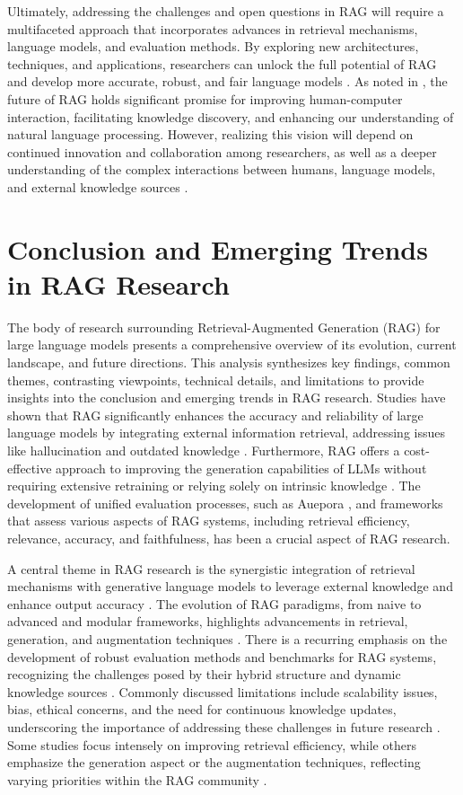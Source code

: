 \documentclass[conference]{IEEEtran}
\begin{document}
Ultimately, addressing the challenges and open questions in RAG will require a multifaceted approach that incorporates advances in retrieval mechanisms, language models, and evaluation methods. By exploring new architectures, techniques, and applications, researchers can unlock the full potential of RAG and develop more accurate, robust, and fair language models \cite{b13}. As noted in \cite{b14}, the future of RAG holds significant promise for improving human-computer interaction, facilitating knowledge discovery, and enhancing our understanding of natural language processing. However, realizing this vision will depend on continued innovation and collaboration among researchers, as well as a deeper understanding of the complex interactions between humans, language models, and external knowledge sources \cite{b15}.

\section{Conclusion and Emerging Trends in RAG Research}
The body of research surrounding Retrieval-Augmented Generation (RAG) for large language models presents a comprehensive overview of its evolution, current landscape, and future directions. This analysis synthesizes key findings, common themes, contrasting viewpoints, technical details, and limitations to provide insights into the conclusion and emerging trends in RAG research. Studies have shown that RAG significantly enhances the accuracy and reliability of large language models by integrating external information retrieval, addressing issues like hallucination and outdated knowledge \cite{b1}. Furthermore, RAG offers a cost-effective approach to improving the generation capabilities of LLMs without requiring extensive retraining or relying solely on intrinsic knowledge \cite{b2}. The development of unified evaluation processes, such as Auepora \cite{b3}, and frameworks that assess various aspects of RAG systems, including retrieval efficiency, relevance, accuracy, and faithfulness, has been a crucial aspect of RAG research.

A central theme in RAG research is the synergistic integration of retrieval mechanisms with generative language models to leverage external knowledge and enhance output accuracy \cite{b4}. The evolution of RAG paradigms, from naive to advanced and modular frameworks, highlights advancements in retrieval, generation, and augmentation techniques \cite{b5}. There is a recurring emphasis on the development of robust evaluation methods and benchmarks for RAG systems, recognizing the challenges posed by their hybrid structure and dynamic knowledge sources \cite{b6}. Commonly discussed limitations include scalability issues, bias, ethical concerns, and the need for continuous knowledge updates, underscoring the importance of addressing these challenges in future research \cite{b7}. Some studies focus intensely on improving retrieval efficiency, while others emphasize the generation aspect or the augmentation techniques, reflecting varying priorities within the RAG community \cite{b8}.
\end{document}
